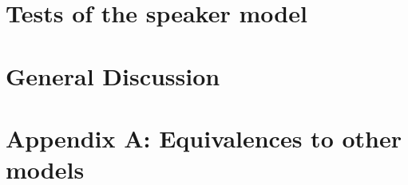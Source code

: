 \documentclass[man,noapacite]{apa2}
\begin{document}
\section{Tests of the speaker model}




\section{General Discussion}


\newpage




\newpage

\theappendix

\section{Appendix A: Equivalences to other models}

\end{document}
